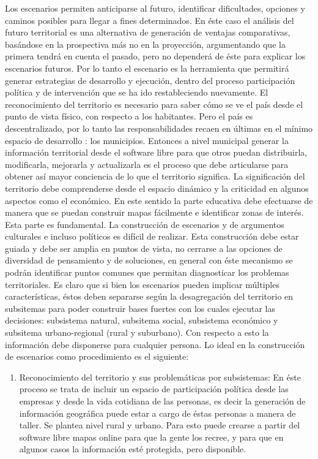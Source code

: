 \begin{multicols}{2}
Los escenarios permiten anticiparse al futuro, identificar  dificultades, opciones y caminos posibles para llegar a fines determinados. En éste caso el análisis del futuro territorial es  una alternativa de generación de ventajas comparativas,  basándose en la  prospectiva más no en la proyección, argumentando que la primera tendrá en cuenta el pasado, pero no dependerá de éste para explicar los escenarios futuros. Por lo tanto el escenario es la herramienta que permitirá generar estrategias de desarrollo y ejecución, dentro del proceso  participación política y de intervención que se ha ido restableciendo nuevamente.  El reconocimiento del territorio es necesario para saber cómo se ve el país desde el punto de vista físico, con respecto a los habitantes. 
Pero el país es descentralizado, por lo tanto las responsabilidades recaen en últimas en el mínimo espacio de desarrollo : los municipios.  
Entonces a nivel municipal generar la información territorial desde el software libre para que otros puedan distribuirla, modificarla, mejorarla y actualizarla es el proceso que debe articularse para obtener así mayor conciencia de lo que el territorio significa. La significación del territorio debe comprenderse desde el espacio dinámico y  la criticidad en algunos aspectos como el económico. En este sentido la parte educativa debe efectuarse de manera que se puedan construir mapas fácilmente e identificar zonas  de interés. Esta parte es fundamental. La construcción de escenarios y de argumentos culturales e incluso políticos es difícil de realizar. Esta construcción debe estar guiada y debe ser amplia en puntos de vista, no cerrarse a las opciones de diversidad de pensamiento y de soluciones, en general con éste mecanismo se podrán identificar puntos comunes que permitan diagnosticar los problemas territoriales.  
Es claro que si bien los escenarios pueden implicar múltiples características, éstos deben separarse según la desagregación del territorio en subsitemas para poder construir bases fuertes con los cuales ejecutar las decisiones: subsistema natural, subsitema social, subsistema económico y subsitema urbano-regional (rural y suburbano). Con respecto a esto la información debe disponerse para cualquier persona.
Lo ideal en la construcción de escenarios como procedimiento es el siguiente:
\begin{enumerate}
\item Reconocimiento del territorio y sus problemáticas por subsistemas: En éste proceso se trata de incluir un espacio de participación política desde las empresas y desde la vida cotidiana de las personas, es decir la generación de información geográfica puede estar a cargo de éstas personas a manera de taller. Se plantea nivel rural y urbano. Para esto puede crearse a partir del software libre mapas online para que la gente los recree, y para que en algunos casos la información esté protegida, pero disponible. 

\end{enumerate}
\end{multicols}
